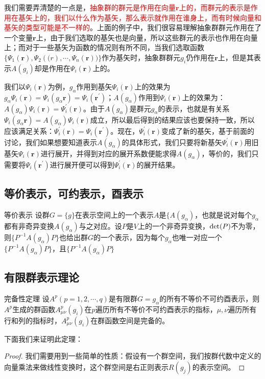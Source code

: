 我们需要弄清楚的一点是，\textcolor{red}{抽象群的群元是作用在向量$\bm{r}$上的，而群元的表示是作用在基矢上的，我们以什么作为基矢，那么表示就作用在谁身上，而有时候向量和基矢的类型可能是不一样的}。上面的例子中，我们很容易理解抽象群群元作用在了一个变量$\bm{r}$上，由于我们选取的基矢也是向量，所以这些群元的表示也作用在向量上；而对于一些基矢为函数的情况则有所不同，当我们选取函数$\{\Psi_1(\bm{r}), \Psi_2(\bm(r), \cdots, \Psi_n(\bm{r}))\}$作为基矢时，抽象群群元$g_i$仍作用在$\bm{r}$上，但是其表示$A(g_i)$却是作用在$\Psi_i(\bm{r})$上的。

我们以$\Psi_i(\bm{r})$为例，$g_\alpha$作用到基矢$\Psi_i(\bm{r})$上的效果为$ g_\alpha \Psi_i(\bm{r}) =\Psi_i(g_\alpha \bm{r}) = \Psi_i(\bm{r}^{\prime})$；$A(g_\alpha)$作用到$\Psi_i(\bm{r})$上的效果为：$ A(g_\alpha)\Psi_i(\bm{r}) = \Psi_i^{\prime}(\bm{r})$。由于$A(g_\alpha)$是群元$g_\alpha$的表示，也就是有关系$\Psi_i(g_\alpha \bm{r}) = A(g_\alpha)\Psi_i(\bm{r})$成立，所以最后得到的结果应该也要保持一致，所以应该满足关系：$\Psi_i^\prime(\bm{r}) = \Psi_i(\bm{r}^\prime)$。现在，$\Psi^\prime_i(\bm{r})$变成了新的基矢，基于前面的讨论，我们如果想要知道表示$A(g_\alpha)$的具体形式，我们只要将新基矢$\Psi_i^{\prime}(\bm{r})$用旧基矢$\Psi_i(\bm{r})$进行展开，并得到对应的展开系数便能求得$A(g_\alpha)$，等价的，我们只需要将$\Psi_i(\bm{r}^\prime)$进行展开便可以得到$\Psi^\prime_i(\bm{r})$的展开结果。

\subsection{等价表示，可约表示，酉表示}
\begin{definition}{等价表示}
	设群$G=\{g\}$在表示空间上的一个表示$A$是$\{A(g_\alpha)$，也就是说对每个$g_\alpha$都有非奇异变换$A(g_\alpha)$与之对应。设$P$是$V$上的一个非奇异变换，${\rm det}(P)$不为零，则$\{P^{-1} A(g_\alpha) P\}$也给出群$G$的一个表示，因为每个$g_\alpha$也唯一对应一个$\{P^{-1}A(g_\alpha)P\}$，且$\{P^{-1}A(g_\alpha)P\}$
\end{definition}

\subsection{有限群表示理论}
\begin{theorem}{完备性定理}
	设$A^{p}(p = 1, 2, \cdots, q)$是有限群$G = {g_{\alpha}}$的所有不等价不可约酉表示，则$A^{p}$生成的群函数$A^{p}_{\mu\nu}(g_{i})$在$p$遍历所有不等价不可约酉表示的指标，$\mu, \nu$遍历所有行和列的指标时，$A^{p}_{\mu\nu}(g_{i})$在群函数空间是完备的。
\end{theorem} 
下面我们来证明此定理：
\begin{proof}
	我们需要用到一些简单的性质：假设有一个群空间，我们按群代数中定义的向量乘法来做线性变换时，这个群空间是右正则表示$R(g_j)$的表示空间。
\end{proof}

